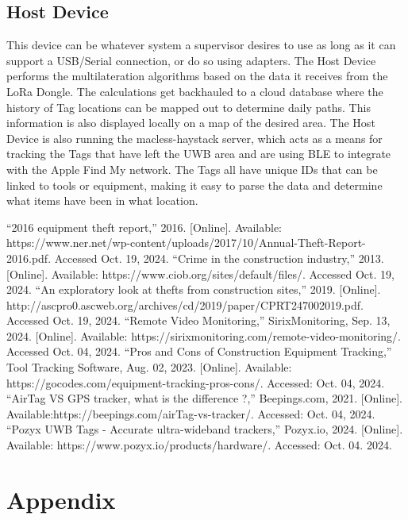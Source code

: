\documentclass[conference]{IEEEtran}
\begin{document}
\subsection{Host Device}

This device can be whatever system a supervisor desires to use as long as 
it can support a USB/Serial connection, or do so using adapters. The Host Device
performs the multilateration algorithms based on the data it receives from the LoRa Dongle.
The calculations get backhauled to a cloud database 
where the history of Tag locations can be mapped out to determine 
daily paths. This information is also displayed locally on a map of 
the desired area. The Host Device is also running the macless-haystack 
server, which acts as a means for tracking the Tags that have 
left the UWB area and are using BLE to integrate with the Apple Find 
My network. The Tags all have unique IDs that can be linked to tools or 
equipment, making it easy to parse the data and determine what items have 
been in what location. 


\begin{thebibliography}{00}
 ``2016 equipment theft report,'' 2016. [Online]. Available: https://www.ner.net/wp-content/uploads/2017/10/Annual-Theft-Report-2016.pdf. Accessed Oct. 19, 2024.
 ``Crime in the construction industry,'' 2013. [Online]. Available: https://www.ciob.org/sites/default/files/. Accessed Oct. 19, 2024.
 ``An exploratory look at thefts from construction sites,'' 2019. [Online]. http://ascpro0.ascweb.org/archives/cd/2019/paper/CPRT247002019.pdf. Accessed Oct. 19, 2024.
 ``Remote Video Monitoring,'' SirixMonitoring, Sep. 13, 2024. [Online]. Available: https://sirixmonitoring.com/remote-video-monitoring/. Accessed Oct. 04, 2024.
 ``Pros and Cons of Construction Equipment Tracking,'' Tool Tracking Software, Aug. 02, 2023. [Online]. Available:  https://gocodes.com/equipment-tracking-pros-cons/. Accessed: Oct. 04, 2024.
 ``AirTag VS GPS tracker, what is the difference ?,'' Beepings.com, 2021. [Online]. Available:https://beepings.com/airTag-vs-tracker/. Accessed: Oct. 04, 2024.
 ``Pozyx UWB Tags - Accurate ultra-wideband trackers,'' Pozyx.io, 2024. [Online]. Available: https://www.pozyx.io/products/hardware/. Accessed: Oct. 04. 2024.
\end{thebibliography}
\vspace{12pt}

\section*{Appendix}
\setcounter{subsection}{0}
\end{document}
